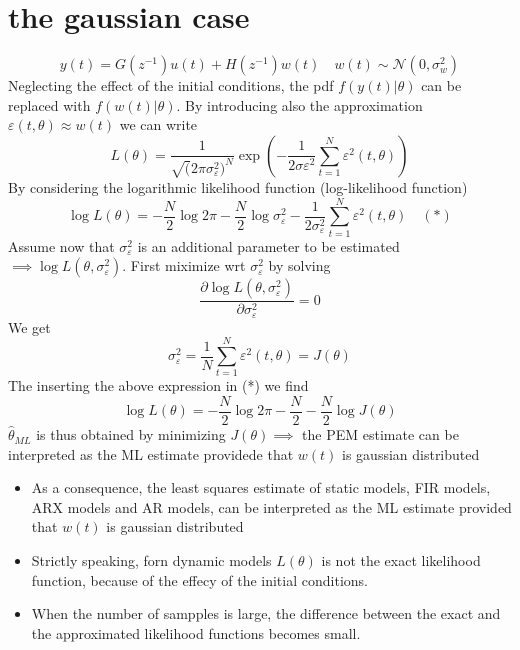 \documentclass{book}
\begin{document}
\section{the gaussian case}
\[
    y(t) = G(z^{-1})u(t) + H(z^{-1})w(t) \quad w(t) \sim \mathcal{N}(0,\sigma_w^2)
\]
Neglecting the effect of the initial conditions, the pdf $f(y(t)|\theta)$ can be replaced with $f(w(t)|\theta)$. By introducing also the approximation $\varepsilon(t,\theta)\approx w(t)$ we can write 
\[
    L(\theta)=\displaystyle\frac{1}{\sqrt(2\pi\sigma_\varepsilon^2)^N}\exp\left(-\displaystyle\frac{1}{2\sigma\varepsilon^2}\displaystyle\sum_{t=1}^{N}\varepsilon^2(t,\theta)\right)
\]
By considering the logarithmic likelihood function (log-likelihood function)
\[
    \log L(\theta) = -\displaystyle\frac{N}{2}\log 2\pi -\displaystyle\frac{N}{2}\log \sigma_\varepsilon^2-\displaystyle\frac{1}{2\sigma_\varepsilon^2}\displaystyle\sum_{t=1}^{N}\varepsilon^2(t,\theta) \quad (*)
\]
Assume now that $\sigma_\varepsilon^2$ is an additional parameter to be estimated $\implies \log L(\theta,\sigma_\varepsilon^2)$. First miximize wrt $\sigma_\varepsilon^2$ by solving 
\[
    \displaystyle\frac{\partial \log L(\theta,\sigma_\varepsilon^2)}{\partial \sigma_\varepsilon^2}=0
\]
We get 
\[
    \sigma_\varepsilon^2=\displaystyle\frac{1}{N}\displaystyle\sum_{t=1}^{N}\varepsilon^2(t,\theta)=J(\theta)
\]
The inserting the above expression in (*) we find 
\[
    \log L(\theta) = -\displaystyle\frac{N}{2}\log 2\pi -\displaystyle\frac{N}{2}-\displaystyle\frac{N}{2}\log J(\theta)
\]
$\hat{\theta}_{ML}$ is thus obtained by minimizing $J(\theta)\implies$ the PEM estimate can be interpreted as the ML estimate providede that $w(t)$ is gaussian distributed 
\begin{itemize}
    \item As a consequence, the least squares estimate of static models, FIR models, ARX models and AR models, can be interpreted as the ML estimate provided that $w(t)$ is gaussian distributed
    \item Strictly speaking, forn dynamic models $L(\theta)$ is not the exact likelihood function, because of the effecy of the initial conditions. 
    \item When the number of sampples is large, the difference between the exact and the approximated likelihood functions becomes small.
\end{itemize}
\end{document}
